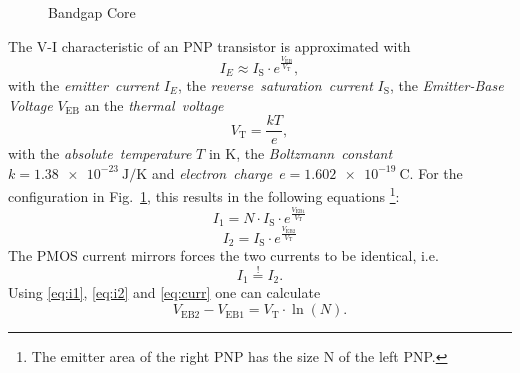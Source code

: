 \documentclass{article}[11pt]
\begin{document}
\notetitle


\cite{widlar-bandgap-71}
\cite{kuijk-bandgap-73}
\cite{brokaw-bandgap-74}
\cite{vittoz-bandgap-79}

\cite{razavi-bandgap-16}
\cite{razavi-bandgap-21}

\cite{rinmora-volref-02}
\cite{ivanov-bandgap-12}
\cite{kok-cmosvoltref-13}
\cite{ma-bandgap-14}
\cite{mohamed-bandgap-19}
\cite{huang-bandgap-21}

\cite{moisello-bandgap-24}


\begin{figure}[H]
  \centering
  \begin{circuitikz}
    
  \end{circuitikz}
  \caption{Bandgap Core}
  \label{fig:badgap-core}
\end{figure}

The V-I characteristic of an PNP transistor is approximated with
\begin{equation}
 I_E \approx I_{\mathrm{S}} \cdot e^{\frac{V_\mathrm{EB}}{V_\mathrm{T}}},
\end{equation}
with the \textit{emitter~current} $I_E$,
the \textit{reverse~saturation~current} $I_{\mathrm{S}}$, the
\textit{Emitter-Base Voltage} $V_\mathrm{EB}$ an the \textit{thermal~voltage}
\begin{equation}\label{eq:vt}
V_\mathrm{T}=\frac{kT}{e},
\end{equation}
with the \textit{absolute~temperature} $T$ in K,
the \textit{Boltzmann~constant}~$k=\SI{1.38e-23}{\joule\per\kelvin}$
and \textit{electron~charge}~$e=\SI{1.602e-19}{\coulomb}$.
For the configuration in Fig.~\ref{fig:badgap-core}, this results in the
following equations
\footnote{The emitter area of the right PNP has the size N of the left PNP.}:
\begin{equation}\label{eq:i1}
 I_1 = N \cdot I_{\mathrm{S}} \cdot e^{\frac{V_\mathrm{EB1}}{V_\mathrm{T}}}
\end{equation}
\begin{equation}\label{eq:i2}
 I_2 = I_{\mathrm{S}} \cdot e^{\frac{V_\mathrm{EB2}}{V_\mathrm{T}}}
\end{equation}
The PMOS current mirrors forces the two currents to be identical, i.e.
\begin{equation}\label{eq:curr}
 I_1 \stackrel{!}{=} I_2.
\end{equation}
Using \eqref{eq:i1}, \eqref{eq:i2} and \eqref{eq:curr} one can calculate
\begin{equation}
V_\mathrm{EB2}-V_\mathrm{EB1} = V_\mathrm{T} \cdot \ln(N).
\end{equation}
\end{document}

